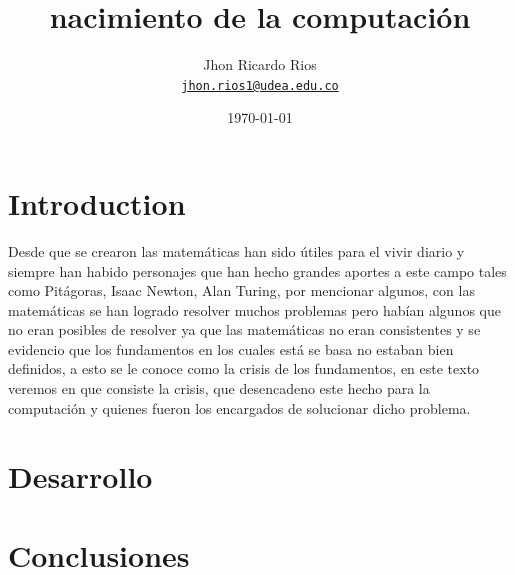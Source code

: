 \documentclass[11pt]{article}
\title{nacimiento de la computación}
\author{Jhon Ricardo Rios\\%
    \href{mailto:jhon.rios1@udea.edu.co}{\texttt{jhon.rios1@udea.edu.co}} %
    }
\date{\today}
\begin{document}
{
\maketitle

}


\section{Introduction}

\begin{center}
Desde que se crearon las matemáticas han sido útiles para el vivir diario y siempre han habido
personajes que han hecho grandes aportes a este campo tales como Pitágoras, Isaac Newton, Alan Turing, por mencionar algunos,
con las matemáticas se han logrado resolver muchos problemas pero habían algunos que no eran posibles de resolver ya que las matemáticas no eran consistentes y se evidencio que los fundamentos en los cuales está se basa no estaban bien definidos, a esto se le conoce como la crisis de los fundamentos, en este texto veremos en que consiste la crisis, que desencadeno este hecho para la computación y quienes fueron los encargados de solucionar dicho problema.
\end{center}

\section{Desarrollo}
\cite{ferreiros2004episodio}

\begin{center}
    
\end{center}
\citep{Chavas2015} %

\section{Conclusiones}
\end{document}
